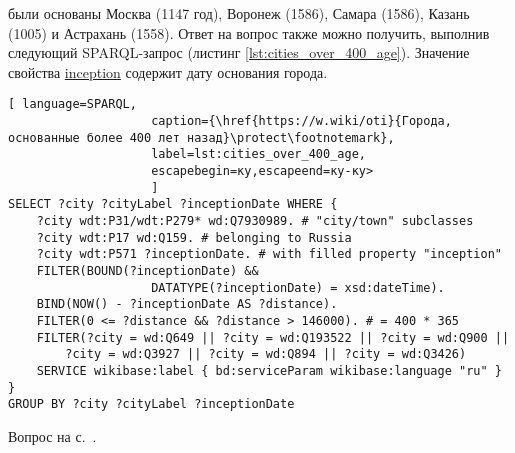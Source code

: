 \begin{task}
    \label{answer:cities_over_400_age}
     были основаны Москва (1147 год), Воронеж (1586), Самара (1586), Казань (1005) и Астрахань (1558). Ответ на вопрос также можно получить, выполнив следующий SPARQL-запрос (листинг \ref{lst:cities_over_400_age}). Значение свойства \href{https://www.wikidata.org/wiki/Property:P571}{inception} содержит дату основания города.
    
    \begin{lstlisting}[ language=SPARQL, 
                    caption={\href{https://w.wiki/oti}{Города, основанные более 400 лет назад}\protect\footnotemark},
                    label=lst:cities_over_400_age, 
                    escapebegin=ку,escapeend=ку-ку>
                    ]
SELECT ?city ?cityLabel ?inceptionDate WHERE {
	?city wdt:P31/wdt:P279* wd:Q7930989. # "city/town" subclasses
	?city wdt:P17 wd:Q159. # belonging to Russia
	?city wdt:P571 ?inceptionDate. # with filled property "inception"
	FILTER(BOUND(?inceptionDate) && 
					DATATYPE(?inceptionDate) = xsd:dateTime).
	BIND(NOW() - ?inceptionDate AS ?distance).
	FILTER(0 <= ?distance && ?distance > 146000). # = 400 * 365
	FILTER(?city = wd:Q649 || ?city = wd:Q193522 || ?city = wd:Q900 ||
		?city = wd:Q3927 || ?city = wd:Q894 || ?city = wd:Q3426)
	SERVICE wikibase:label { bd:serviceParam wikibase:language "ru" }
}
GROUP BY ?city ?cityLabel ?inceptionDate    
\end{lstlisting}

    \small{Вопрос на с.~\pageref{fig:city_relation_Russia_S_N}.}
\end{task}

